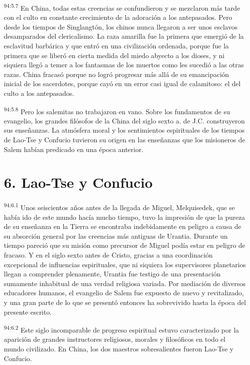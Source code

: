 \par
\textsuperscript{94:5.7} En China, todas estas creencias se confundieron y se mezclaron más tarde con el culto en constante crecimiento de la adoración a los antepasados. Pero desde los tiempos de Singlangtón, los chinos nunca llegaron a ser unos esclavos desamparados del clericalismo. La raza amarilla fue la primera que emergió de la esclavitud barbárica y que entró en una civilización ordenada, porque fue la primera que se liberó en cierta medida del miedo abyecto a los dioses, y ni siquiera llegó a temer a los fantasmas de los muertos como les sucedió a las otras razas. China fracasó porque no logró progresar más allá de su emancipación inicial de los sacerdotes, porque cayó en un error casi igual de calamitoso: el del culto a los antepasados.

\par
\textsuperscript{94:5.8} Pero los salemitas no trabajaron en vano. Sobre los fundamentos de su evangelio, los grandes filósofos de la China del siglo sexto a. de J.C. construyeron sus enseñanzas. La atmósfera moral y los sentimientos espirituales de los tiempos de Lao-Tse y Confucio tuvieron su origen en las enseñanzas que los misioneros de Salem habían predicado en una época anterior.

\section*{6. Lao-Tse y Confucio}
\par
\textsuperscript{94:6.1} Unos seiscientos años antes de la llegada de Miguel, Melquisedek, que se había ido de este mundo hacía mucho tiempo, tuvo la impresión de que la pureza de su enseñanza en la Tierra se encontraba indebidamente en peligro a causa de su absorción general por las creencias más antiguas de Urantia. Durante un tiempo pareció que su misión como precursor de Miguel podía estar en peligro de fracaso. Y en el siglo sexto antes de Cristo, gracias a una coordinación excepcional de influencias espirituales, que ni siquiera los supervisores planetarios llegan a comprender plenamente, Urantia fue testigo de una presentación sumamente inhabitual de una verdad religiosa variada. Por mediación de diversos educadores humanos, el evangelio de Salem fue expuesto de nuevo y revitalizado, y una gran parte de lo que se presentó entonces ha sobrevivido hasta la época del presente escrito.

\par
\textsuperscript{94:6.2} Este siglo incomparable de progreso espiritual estuvo caracterizado por la aparición de grandes instructores religiosos, morales y filosóficos en todo el mundo civilizado. En China, los dos maestros sobresalientes fueron Lao-Tse y Confucio.


